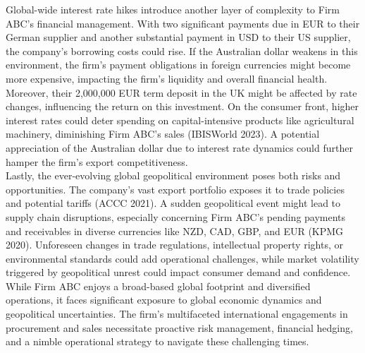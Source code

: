 \documentclass{article}
\begin{document}
\noindent Global-wide interest rate hikes introduce another layer of complexity to Firm ABC's financial management. With two significant payments due in EUR to their German supplier and another substantial payment in USD to their US supplier, the company's borrowing costs could rise. If the Australian dollar weakens in this environment, the firm's payment obligations in foreign currencies might become more expensive, impacting the firm's liquidity and overall financial health. Moreover, their 2,000,000 EUR term deposit in the UK might be affected by rate changes, influencing the return on this investment. On the consumer front, higher interest rates could deter spending on capital-intensive products like agricultural machinery, diminishing Firm ABC's sales (IBISWorld 2023). A potential appreciation of the Australian dollar due to interest rate dynamics could further hamper the firm's export competitiveness.\\

\noindent Lastly, the ever-evolving global geopolitical environment poses both risks and opportunities. The company's vast export portfolio exposes it to trade policies and potential tariffs (ACCC 2021). A sudden geopolitical event might lead to supply chain disruptions, especially concerning Firm ABC's pending payments and receivables in diverse currencies like NZD, CAD, GBP, and EUR (KPMG 2020). Unforeseen changes in trade regulations, intellectual property rights, or environmental standards could add operational challenges, while market volatility triggered by geopolitical unrest could impact consumer demand and confidence.\\

\noindent While Firm ABC enjoys a broad-based global footprint and diversified operations, it faces significant exposure to global economic dynamics and geopolitical uncertainties. The firm's multifaceted international engagements in procurement and sales necessitate proactive risk management, financial hedging, and a nimble operational strategy to navigate these challenging times.\\
\end{document}
